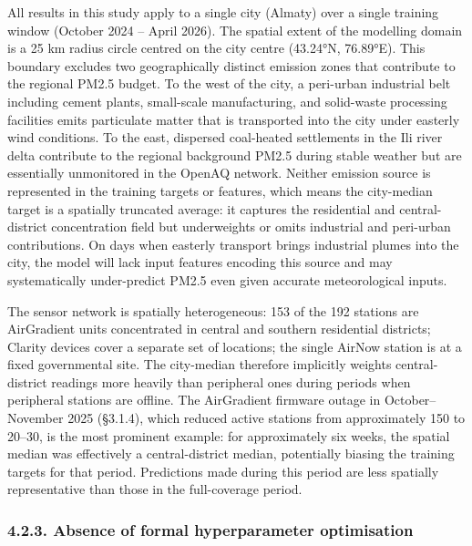 All results in this study apply to a single city (Almaty) over a single training window (October 2024 -- April 2026). The spatial extent of the modelling domain is a 25 km radius circle centred on the city centre (43.24°N, 76.89°E). This boundary excludes two geographically distinct emission zones that contribute to the regional PM2.5 budget. To the west of the city, a peri-urban industrial belt including cement plants, small-scale manufacturing, and solid-waste processing facilities emits particulate matter that is transported into the city under easterly wind conditions. To the east, dispersed coal-heated settlements in the Ili river delta contribute to the regional background PM2.5 during stable weather but are essentially unmonitored in the OpenAQ network. Neither emission source is represented in the training targets or features, which means the city-median target is a spatially truncated average: it captures the residential and central-district concentration field but underweights or omits industrial and peri-urban contributions. On days when easterly transport brings industrial plumes into the city, the model will lack input features encoding this source and may systematically under-predict PM2.5 even given accurate meteorological inputs.

The sensor network is spatially heterogeneous: 153 of the 192 stations are AirGradient units concentrated in central and southern residential districts; Clarity devices cover a separate set of locations; the single AirNow station is at a fixed governmental site. The city-median therefore implicitly weights central-district readings more heavily than peripheral ones during periods when peripheral stations are offline. The AirGradient firmware outage in October--November 2025 (§3.1.4), which reduced active stations from approximately 150 to 20--30, is the most prominent example: for approximately six weeks, the spatial median was effectively a central-district median, potentially biasing the training targets for that period. Predictions made during this period are less spatially representative than those in the full-coverage period.

\subsubsection{4.2.3. Absence of formal hyperparameter optimisation}\label{absence-of-formal-hyperparameter-optimisation}

